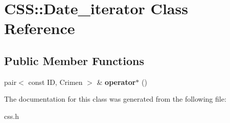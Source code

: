 \hypertarget{classCSS_1_1Date__iterator}{}\section{C\+S\+S\+:\+:Date\+\_\+iterator Class Reference}
\label{classCSS_1_1Date__iterator}
\subsection*{Public Member Functions}
\begin{DoxyCompactItemize}
\item 
\hypertarget{classCSS_1_1Date__iterator_a85694ed3158dbb806869191f46bb0ae0}{}pair$<$ const I\+D, Crimen $>$ \& {\bfseries operator$\ast$} ()\label{classCSS_1_1Date__iterator_a85694ed3158dbb806869191f46bb0ae0}

\end{DoxyCompactItemize}


The documentation for this class was generated from the following file\+:\begin{DoxyCompactItemize}
\item 
css.\+h\end{DoxyCompactItemize}
